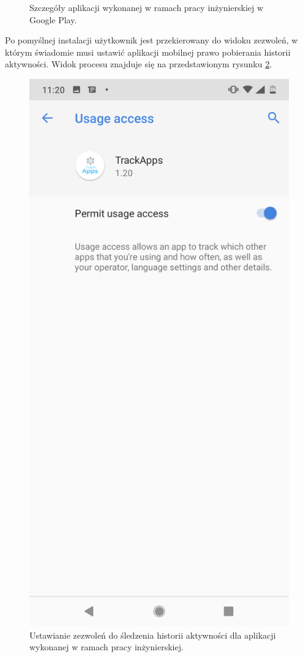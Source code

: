 \documentclass[a4paper,twoside,12pt]{book}
\begin{document}
\begin{figure}[h!]
    \caption{Szczegóły aplikacji wykonanej w ramach pracy inżynierskiej w Google Play.}
    \label{fig:google_play_screen}
\end{figure}

Po pomyślnej instalacji użytkownik jest przekierowany do widoku zezwoleń, w którym świadomie musi ustawić aplikacji mobilnej prawo pobierania historii aktywności. Widok procesu znajduje się na przedstawionym rysunku \ref{fig:usage_access}.

\begin{figure}[h!]
    \centering
    \includegraphics[scale=0.2]{images/usage_access_screen.png}
    \caption{Ustawianie zezwoleń do śledzenia historii aktywności dla aplikacji wykonanej w ramach pracy inżynierskiej.}
    \label{fig:usage_access}
\end{figure}
\end{document}
